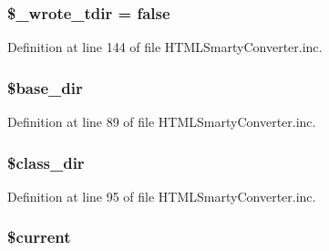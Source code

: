 \hypertarget{class_h_t_m_l_smarty_converter_a3c7d0e40ed3bd6e27d5953cbbab6995e}{
\subsubsection[{\$\-\_\-wrote\-\_\-tdir}]{\setlength{\rightskip}{0pt plus 5cm}\$\-\_\-wrote\-\_\-tdir = false}}\label{class_h_t_m_l_smarty_converter_a3c7d0e40ed3bd6e27d5953cbbab6995e}


\-Definition at line 144 of file \-H\-T\-M\-L\-Smarty\-Converter.\-inc.

\hypertarget{class_h_t_m_l_smarty_converter_aa36f57c62963507498e1181f9a75bbb9}{
\subsubsection[{\$base\-\_\-dir}]{\setlength{\rightskip}{0pt plus 5cm}\$base\-\_\-dir}}\label{class_h_t_m_l_smarty_converter_aa36f57c62963507498e1181f9a75bbb9}


\-Definition at line 89 of file \-H\-T\-M\-L\-Smarty\-Converter.\-inc.

\hypertarget{class_h_t_m_l_smarty_converter_aaeaa82d379050faafbb4bf4b82733c94}{
\subsubsection[{\$class\-\_\-dir}]{\setlength{\rightskip}{0pt plus 5cm}\$class\-\_\-dir}}\label{class_h_t_m_l_smarty_converter_aaeaa82d379050faafbb4bf4b82733c94}


\-Definition at line 95 of file \-H\-T\-M\-L\-Smarty\-Converter.\-inc.

\hypertarget{class_h_t_m_l_smarty_converter_a2c4c58e377f6c66ca38c8ea97666fc5e}{
\subsubsection[{\$current}]{\setlength{\rightskip}{0pt plus 5cm}\$current}}\label{class_h_t_m_l_smarty_converter_a2c4c58e377f6c66ca38c8ea97666fc5e}


